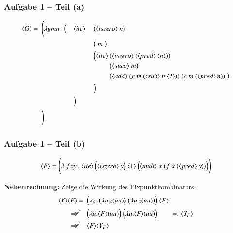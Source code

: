 \documentclass[aspectratio=1610,onlymath, ngerman]{beamer}
\renewcommand{\emph}[1]{\textbf{#1}}
\newcommand{\num}[1]{\ensuremath{\langle #1 \rangle}}
\begin{document}
	\begin{frame} \frametitle{Aufgabe 1 -- Teil (a)}
	\small
		\begin{alignat*}{3}
		\num{G} = \enskip & \Biggl( \lambda g mn \ . \ \Bigl( &&\num{ite} \ && \bigl( \num{iszero} \ n \bigr) \\
		&&&&& \bigl( \ m \ \bigr) \\
		&&&&& \Bigl( 
		\begin{alignedat}[t]{1}
		\num{ite} \ &(\num{iszero} \ (\num{pred} \ \num{n})) \\
		& \bigl( \num{succ} \ m \bigr) \\
		& \bigl( \num{add} \ (g \ m \ (\num{sub} \ n \ \num{2})) \ (g \ m \ (\num{pred} \ n)) \ \bigr) \\				
		\end{alignedat} \\
		&&&&& \Bigr) \\
		&&& \Bigr) \\
		& \Biggr)
		\end{alignat*}
	\end{frame}


	\begin{frame} \frametitle{Aufgabe 1 -- Teil (b)}
	\small
		\begin{equation*}
			\num{F} = \Biggl( \lambda \ f xy \ . \ \num{ite} \ \Bigl(\num{iszero} \ y \Bigr) \ \num{1} \ \Bigl( \num{mult} \ x \ (f \ x \ (\num{pred} \ y)) \Bigr) \Biggr)
		\end{equation*}
		
		\bigskip 
		\pause
		
		\emph{Nebenrechnung:} Zeige die Wirkung des Fixpunktkombinators.
		\pause
		\begin{align*}
			\num{Y} \num{F}
			= \enskip &\Bigl( \lambda z . \ \bigl( \lambda u . z (uu) \bigr) \ \bigl( \lambda u. z (uu) \bigr) \Bigr) \ \num{F} \\
			\Rightarrow^{\beta} \quad &\Bigl( \lambda u . \num{F} (uu) \Bigr) \ \Bigl( \lambda u. \num{F} (uu) \Bigr) \qquad =: \num{Y_F} \\
			\Rightarrow^{\beta} \quad &\num{F} \num{Y_F}
		\end{align*}
	\end{frame}
\end{document}
